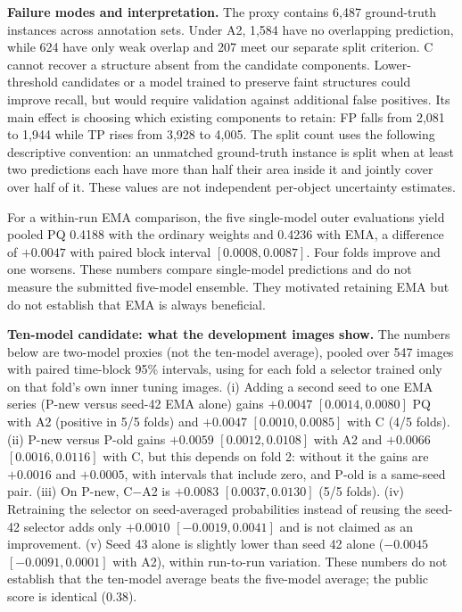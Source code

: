 \documentclass[sigconf]{acmart}
\begin{document}
\textbf{Failure modes and interpretation.} The proxy contains 6,487 ground-truth instances across annotation sets. Under A2, 1,584 have no overlapping prediction, while 624 have only weak overlap and 207 meet our separate split criterion. C cannot recover a structure absent from the candidate components. Lower-threshold candidates or a model trained to preserve faint structures could improve recall, but would require validation against additional false positives. Its main effect is choosing which existing components to retain: FP falls from 2,081 to 1,944 while TP rises from 3,928 to 4,005. The split count uses the following descriptive convention: an unmatched ground-truth instance is split when at least two predictions each have more than half their area inside it and jointly cover over half of it. These values are not independent per-object uncertainty estimates.

For a within-run EMA comparison, the five single-model outer evaluations yield pooled PQ 0.4188 with the ordinary weights and 0.4236 with EMA, a difference of $+0.0047$ with paired block interval $[0.0008,0.0087]$. Four folds improve and one worsens. These numbers compare single-model predictions and do not measure the submitted five-model ensemble. They motivated retaining EMA but do not establish that EMA is always beneficial.

\textbf{Ten-model candidate: what the development images show.} The numbers below are two-model proxies (not the ten-model average), pooled over 547 images with paired time-block 95\% intervals, using for each fold a selector trained only on that fold's own inner tuning images. (i) Adding a second seed to one EMA series (P-new versus seed-42 EMA alone) gains $+0.0047$ $[0.0014,0.0080]$ PQ with A2 (positive in 5/5 folds) and $+0.0047$ $[0.0010,0.0085]$ with C (4/5 folds). (ii) P-new versus P-old gains $+0.0059$ $[0.0012,0.0108]$ with A2 and $+0.0066$ $[0.0016,0.0116]$ with C, but this depends on fold 2: without it the gains are $+0.0016$ and $+0.0005$, with intervals that include zero, and P-old is a same-seed pair. (iii) On P-new, C$-$A2 is $+0.0083$ $[0.0037,0.0130]$ (5/5 folds). (iv) Retraining the selector on seed-averaged probabilities instead of reusing the seed-42 selector adds only $+0.0010$ $[-0.0019,0.0041]$ and is not claimed as an improvement. (v) Seed 43 alone is slightly lower than seed 42 alone ($-0.0045$ $[-0.0091,0.0001]$ with A2), within run-to-run variation. These numbers do not establish that the ten-model average beats the five-model average; the public score is identical (0.38).
\end{document}
